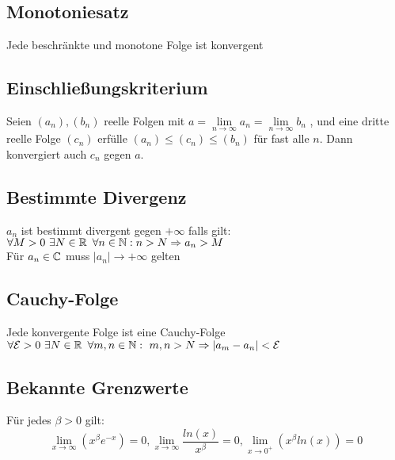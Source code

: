 \documentclass[german]{latex4ei/latex4ei_sheet}
\begin{document}
\begin{sectionbox}
	\subsection{Monotoniesatz}

	Jede beschränkte und monotone Folge ist konvergent

\end{sectionbox}



\begin{sectionbox}
	\subsection{Einschließungskriterium}

Seien $(a_n), (b_n)$  reelle Folgen mit $a = \lim\limits_{n \to \infty}  a_n =  \lim\limits_{n \to \infty}b_n $ , und eine dritte reelle Folge $(c_n)$ erfülle  $(a_n) \le (c_n) \le (b_n)$ für fast alle $n$. Dann konvergiert auch \(c_n\)  gegen $a$.


\end{sectionbox}

\begin{sectionbox}
	\subsection{Bestimmte Divergenz}

	\(a_n\) ist bestimmt divergent gegen $+\infty$ falls gilt: \\
	$\forall M >0 \text{ }\exists N \in \operatorname{\mathbb R} \text{ }\forall n \in \operatorname{\mathbb N}: n>N \Rightarrow a_n>M$ \\
Für $a_n \in \mathbb C $ muss $|a_n| \rightarrow +\infty $ gelten
\end{sectionbox}


\begin{sectionbox}
	\subsection{Cauchy-Folge}
	Jede konvergente Folge ist eine Cauchy-Folge \\
	$	\forall\mathcal{E}>0 \text{ }\exists N \in \operatorname{\mathbb R} \text{ }\forall m,n \in \operatorname{\mathbb N}:\text{ } m,n>N \Rightarrow |a_m - a_n|<\mathcal{E}$

\end{sectionbox}

\begin{sectionbox}
	\subsection{Bekannte Grenzwerte}
	Für jedes $\beta > 0$ gilt:
	\begin{equation*}
		\lim \limits_{x \to \infty}(x^\beta e^{-x})= 0, \lim \limits_{x \to \infty} \frac{ln(x)}{x^\beta} = 0, \lim \limits_{x \to 0^+}(x^\beta ln(x))= 0
	\end{equation*}

\end{sectionbox}
\end{document}
